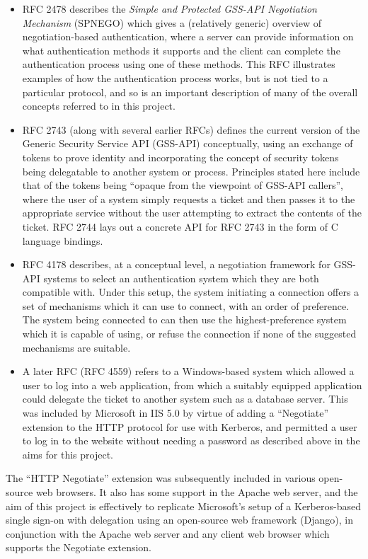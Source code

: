 \documentclass{report}
\begin{document}
\begin{itemize}
\item
  RFC 2478\cite{RFC2478} describes the \textit{Simple and Protected GSS-API Negotiation Mechanism} (SPNEGO) which gives a (relatively generic) overview of negotiation-based authentication, where a server can provide information on what authentication methods it supports and the client can complete the authentication process using one of these methods. This RFC illustrates examples of how the authentication process works, but is not tied to a particular protocol, and so is an important description of many of the overall concepts referred to in this project.
\item
  RFC 2743\cite{RFC2743} (along with several earlier RFCs) defines the current version of the Generic Security Service API (GSS-API) conceptually, using an exchange of tokens to prove identity and incorporating the concept of security tokens being delegatable to another system or process. Principles stated here include that of the tokens being ``opaque from the viewpoint of GSS-API callers'', where the user of a system simply requests a ticket and then passes it to the appropriate service without the user attempting to extract the contents of the ticket. RFC 2744\cite{RFC2744} lays out a concrete API for RFC 2743 in the form of C language bindings.
\item
  RFC 4178\cite{RFC4178} describes, at a conceptual level, a negotiation framework for GSS-API systems to select an authentication system which they are both compatible with. Under this setup, the system initiating a connection offers a set of mechanisms which it can use to connect, with an order of preference. The system being connected to can then use the highest-preference system which it is capable of using, or refuse the connection if none of the suggested mechanisms are suitable.
\item
  A later RFC (RFC 4559\cite{RFC4559}) refers to a Windows-based system which allowed a user to log into a web application, from which a suitably equipped application could delegate the ticket to another system such as a database server. This was included by Microsoft in IIS 5.0 by virtue of adding a ``Negotiate'' extension to the HTTP protocol for use with Kerberos, and permitted a user to log in to the website without needing a password as described above in the aims for this project.
\end{itemize}

The ``HTTP Negotiate'' extension was subsequently included in various open-source web browsers. It also has some support in the Apache web server, and the aim of this project is effectively to replicate Microsoft's setup of a Kerberos-based single sign-on with delegation using an open-source web framework (Django), in conjunction with the Apache web server and any client web browser which supports the Negotiate extension.
\end{document}
